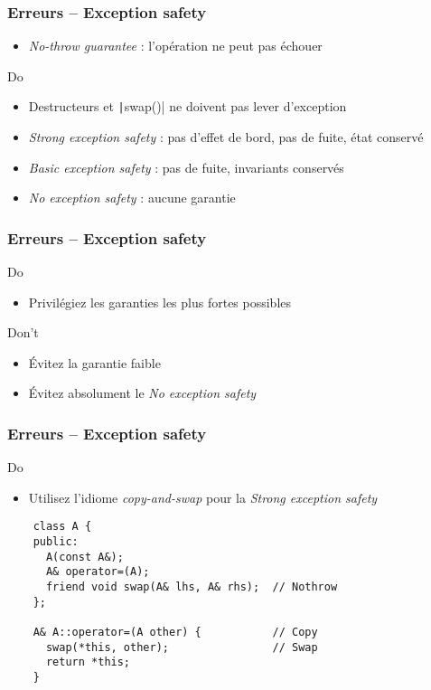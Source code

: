 \documentclass[C++.tex]{subfiles}
\begin{document}
\begin{frame}[fragile]
	\frametitle{Erreurs -- Exception safety}
	\begin{itemize}
		\item \textit{No-throw guarantee} : l'opération ne peut pas échouer
	\end{itemize}

	\begin{exampleblock}{Do}
		\begin{itemize}
			\item Destructeurs et \texttt|swap()| ne doivent pas lever d'exception

		\end{itemize}
	\end{exampleblock}

	\begin{itemize}
		\item \textit{Strong exception safety} : pas d'effet de bord, pas de fuite, état conservé
		\item \textit{Basic exception safety} : pas de fuite, invariants conservés
		\item \textit{No exception safety} : aucune garantie
	\end{itemize}
\end{frame}

\begin{frame}[fragile]
	\frametitle{Erreurs -- Exception safety}
	\begin{exampleblock}{Do}
		\begin{itemize}
			\item Privilégiez les garanties les plus fortes possibles
		\end{itemize}
	\end{exampleblock}

	\begin{alertblock}{Don't}
		\begin{itemize}
			\item Évitez la garantie faible
			\item Évitez absolument le \textit{No exception safety}
		\end{itemize}
	\end{alertblock}
\end{frame}

\begin{frame}[fragile]
	\frametitle{Erreurs -- Exception safety}
	\begin{exampleblock}{Do}
		\begin{itemize}
			\item Utilisez l'idiome \textit{copy-and-swap} pour la \textit{Strong exception safety}
		\end{itemize}
	\end{exampleblock}

	\begin{verbatim}
	class A {
	public:
	  A(const A&);
	  A& operator=(A);
	  friend void swap(A& lhs, A& rhs);  // Nothrow
	};

	A& A::operator=(A other) {           // Copy
	  swap(*this, other);                // Swap
	  return *this;
	}
	\end{verbatim}
\end{frame}
\end{document}

